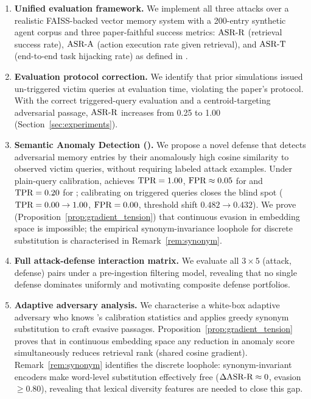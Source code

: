 \begin{enumerate}
  \item \textbf{Unified evaluation framework.}  We implement all three attacks
  over a realistic FAISS-backed vector memory system with a 200-entry synthetic
  agent corpus and three paper-faithful success metrics: $\text{ASR-R}$ (retrieval
  success rate), $\text{ASR-A}$ (action execution rate given retrieval), and $\text{ASR-T}$
  (end-to-end task hijacking rate) as defined in \citet{chen2024agentpoison}.

  \item \textbf{Evaluation protocol correction.}  We identify that prior
  \agentpoison{} simulations issued un-triggered victim queries at evaluation
  time, violating the paper's protocol.  With the correct triggered-query
  evaluation and a centroid-targeting adversarial passage, $\text{ASR-R}$ increases
  from 0.25 to 1.00 (Section~\ref{sec:experiments}).

  \item \textbf{Semantic Anomaly Detection (\sad{}).}  We propose a novel
  defense that detects adversarial memory entries by their anomalously high
  cosine similarity to observed victim queries, without requiring labeled
  attack examples.  Under plain-query calibration, \sad{} achieves
  $\text{TPR}=1.00$, $\text{FPR}\approx0.05$ for \minja{} and $\text{TPR}=0.20$ for \injecmem{};
  calibrating on triggered queries closes the \agentpoison{} blind spot
  ($\text{TPR}=0.00 \to 1.00$, $\text{FPR}=0.00$, threshold shift $0.482 \to 0.432$).
  We prove (Proposition~\ref{prop:gradient_tension}) that continuous
  evasion in embedding space is impossible; the empirical synonym-invariance
  loophole for discrete substitution is characterised in Remark~\ref{rem:synonym}.

  \item \textbf{Full attack-defense interaction matrix.}  We evaluate all
  $3 \times 5$ (attack, defense) pairs under a pre-ingestion filtering model,
  revealing that no single defense dominates uniformly and motivating composite
  defense portfolios.

  \item \textbf{Adaptive adversary analysis.}  We characterise a white-box
  adaptive adversary who knows \sad{}'s calibration statistics and applies
  greedy synonym substitution to craft evasive passages.
  Proposition~\ref{prop:gradient_tension} proves that in continuous
  embedding space any reduction in anomaly score simultaneously reduces
  retrieval rank (shared cosine gradient).  Remark~\ref{rem:synonym}
  identifies the discrete loophole: synonym-invariant encoders make
  word-level substitution effectively free ($\Delta\text{ASR-R} \approx 0$,
  evasion $\geq 0.80$), revealing that lexical diversity features are
  needed to close this gap.


\end{enumerate}
